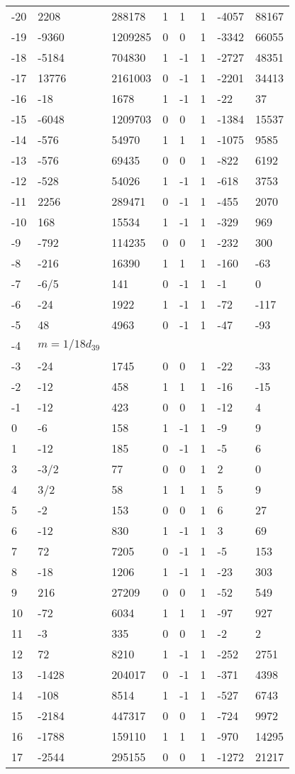 \documentclass{amsart}
\begin{document}
\begin{longtable}{|l|l|l|lllll|}
-20&2208&288178&1&1&1&-4057&88167\\
-19&-9360&1209285&0&0&1&-3342&66055\\
-18&-5184&704830&1&-1&1&-2727&48351\\
-17&13776&2161003&0&-1&1&-2201&34413\\
-16&-18&1678&1&-1&1&-22&37\\
-15&-6048&1209703&0&0&1&-1384&15537\\
-14&-576&54970&1&1&1&-1075&9585\\
-13&-576&69435&0&0&1&-822&6192\\
-12&-528&54026&1&-1&1&-618&3753\\
-11&2256&289471&0&-1&1&-455&2070\\
-10&168&15534&1&-1&1&-329&969\\
-9&-792&114235&0&0&1&-232&300\\
-8&-216&16390&1&1&1&-160&-63\\
-7&-6/5&141&0&-1&1&-1&0\\
-6&-24&1922&1&-1&1&-72&-117\\
-5&48&4963&0&-1&1&-47&-93\\
-4&$m=1/18d_{39}$&&\multicolumn{5}{c|}{}\\
-3&-24&1745&0&0&1&-22&-33\\
-2&-12&458&1&1&1&-16&-15\\
-1&-12&423&0&0&1&-12&4\\
0&-6&158&1&-1&1&-9&9\\
1&-12&185&0&-1&1&-5&6\\
3&-3/2&77&0&0&1&2&0\\
4&3/2&58&1&1&1&5&9\\
5&-2&153&0&0&1&6&27\\
6&-12&830&1&-1&1&3&69\\
7&72&7205&0&-1&1&-5&153\\
8&-18&1206&1&-1&1&-23&303\\
9&216&27209&0&0&1&-52&549\\
10&-72&6034&1&1&1&-97&927\\
11&-3&335&0&0&1&-2&2\\
12&72&8210&1&-1&1&-252&2751\\
13&-1428&204017&0&-1&1&-371&4398\\
14&-108&8514&1&-1&1&-527&6743\\
15&-2184&447317&0&0&1&-724&9972\\
16&-1788&159110&1&1&1&-970&14295\\
17&-2544&295155&0&0&1&-1272&21217\\

\end{longtable}
\end{document}
